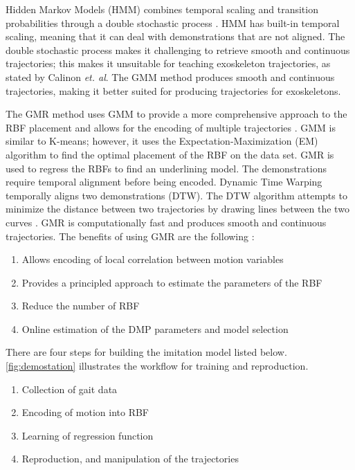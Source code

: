 Hidden Markov Models (HMM) combines temporal scaling and transition probabilities through a double stochastic process \cite{calinon2007learning}. HMM has built-in temporal scaling, meaning that it can deal with demonstrations that are not aligned. The double stochastic process makes it challenging to retrieve smooth and continuous trajectories; this makes it unsuitable for teaching exoskeleton trajectories, as stated by Calinon \textit{et. al}. The GMM method produces smooth and continuous trajectories, making it better suited for producing trajectories for exoskeletons. 

The GMR method uses GMM to provide a more comprehensive approach to the RBF placement and allows for the encoding of multiple trajectories \cite{calinon2013compliant}. GMM is similar to K-means; however, it uses the Expectation-Maximization (EM) algorithm to find the optimal placement of the RBF on the data set. GMR is used to regress the RBFs to find an underlining model. The demonstrations require temporal alignment before being encoded. Dynamic Time Warping temporally aligns two demonstrations (DTW). The DTW algorithm attempts to minimize the distance between two trajectories by drawing lines between the two curves \cite{muller2007dynamic} \cite{JSSv031i07}. 
 GMR is computationally fast and produces smooth and continuous trajectories. The benefits of using GMR are the following \cite{Calinon}: 


\begin{enumerate}[noitemsep]
    \item Allows encoding of local correlation between motion variables
    \item Provides a principled approach to estimate the parameters of the RBF 
    \item Reduce the number of RBF   
    \item Online estimation of the DMP parameters and model selection   
\end{enumerate}  

There are four steps for building the imitation model listed below. \autoref{fig:demostation} illustrates the workflow for training and reproduction.

\begin{enumerate}[noitemsep]
    \item Collection of gait data
    \item Encoding of motion into RBF
    \item Learning of regression function
    \item Reproduction, and manipulation of the trajectories
\end{enumerate}


